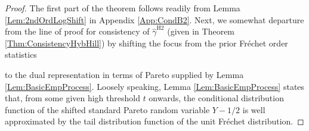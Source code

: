 \documentclass[11pt, a4paper, oneside]{article}
\numberwithin{equation}{section}
\theoremstyle{plain}
\theoremstyle{definition}
\newcommand{\id}{\ensuremath{\displaystyle{\mathop {=} ^d}}}
\newcommand{\sumab}[2]{\ensuremath{\sum\limits_{#1}^{#2}}}
\begin{document}
\begin{proof}
The first part of the theorem follows readily from Lemma \ref{Lem:2ndOrdLogShift} in Appendix \ref{App:CondB2}. Next, we somewhat departure from the line of proof for consistency of $\hat{\gamma}^{\textrm{H2}}$ (given in Theorem \ref{Thm:ConsistencyHybHill}) by shifting the focus from the prior Fr\'echet order statistics
%

%
to the dual representation in terms of Pareto supplied by Lemma \ref{Lem:BasicEmpProcess}. Loosely speaking, Lemma \ref{Lem:BasicEmpProcess} states that, from some given high threshold $t$ onwards, the conditional distribution function of the shifted standard Pareto random variable $Y-1/2$ is well approximated by the tail distribution function of the unit Fr\'echet distribution.


\end{proof}
\end{document}
